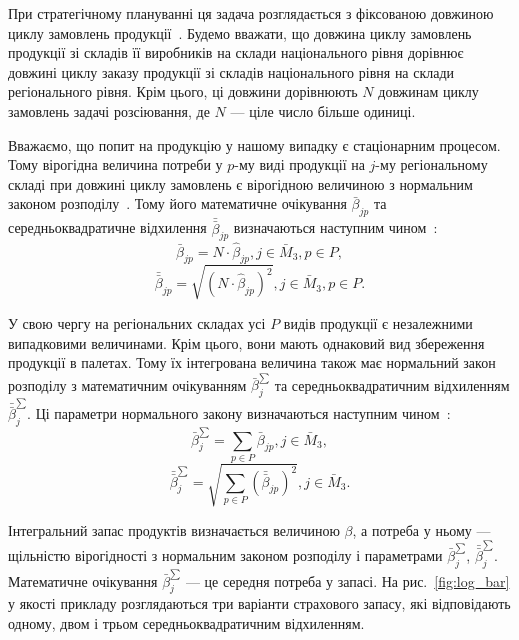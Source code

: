 При стратегічному плануванні ця задача розглядається з фіксованою довжиною циклу замовлень продукції~\cite{Stankevich}. Будемо вважати, що довжина циклу замовлень продукції зі складів її виробників на склади національного рівня дорівнює довжині циклу заказу продукції зі складів національного рівня на склади регіонального рівня. Крім цього, ці довжини дорівнюють $N$ довжинам циклу замовлень задачі розсіювання, де $N$ --- ціле число більше одиниці.

Вважаємо, що попит на продукцію у нашому випадку є стаціонарним процесом. Тому вірогідна величина потреби у $p$-му виді продукції на $j$-му регіональному складі при довжині циклу замовлень є вірогідною величиною з нормальним законом розподілу~\cite{Stankevich}. Тому його математичне очікування $\bar{\beta}_{jp}$ та середньоквадратичне відхилення $\bar{\bar{\beta}}_{jp}$ визначаються наступним чином~\cite{Stankevich}:
\begin{equation}
	\bar{\beta}_{jp} = N \cdot \hat{\beta}_{jp}, j \in \bar{M}_3, p \in P,
\end{equation}
\begin{equation}
	\bar{\bar{\beta}}_{jp} = \sqrt{(N \cdot \hat{\beta}_{jp})^2}, j \in \bar{M}_3, p \in P.
\end{equation}

У свою чергу на регіональних складах усі $P$ видів продукції є незалежними випадковими величинами. Крім цього, вони мають однаковий вид збереження продукції в палетах. Тому їх інтегрована величина також має нормальний закон розподілу з математичним очікуванням $\bar{\beta}_j^{\sum}$ та середньоквадратичним відхиленням $\bar{\bar{\beta}}_j^{\sum}$. Ці параметри нормального закону визначаються наступним чином~\cite{Stankevich}:
\begin{equation} \label{eq:b_2}
	\bar{\beta}_{j}^{\sum} = \sum_{p\in P} \bar{\beta}_{jp}, j \in \bar{M}_3,
\end{equation}
\begin{equation}
	\bar{\bar{\beta}}_{j}^{\sum} = \sqrt{\sum_{p\in P}(\bar{\bar{\beta}}_{jp})^2}, j \in \bar{M}_3.
\end{equation}

Інтегральний запас продуктів визначається величиною $\beta$, а потреба у ньому --- щільністю вірогідності з нормальним законом розподілу і параметрами $\bar{\beta}_j^{\sum}$, $\bar{\bar{\beta}}_j^{\sum}$. Математичне очікування $\bar{\beta}_j^{\sum}$ --- це середня потреба у запасі. На рис.~\ref{fig:log_bar} у якості прикладу розглядаються три варіанти страхового запасу, які відповідають одному, двом і трьом середньоквадратичним відхиленням.

